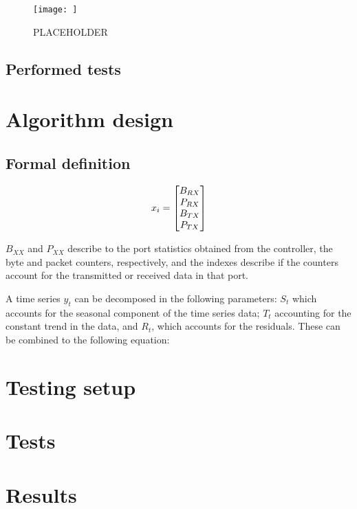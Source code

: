 \pagebreak
\begin{figure} 
    \centering
    \texttt{[image: ]}
    \caption {PLACEHOLDER}
    \label{fig:test_setup}
\end{figure} 

\subsection {Performed tests}

\subsubsection {}


\section {Algorithm design}
\subsection {Formal definition}


\begin {equation*}
\centering
x_i = 
\begin{bmatrix}
B_{RX}\\
P_{RX}\\
B_{TX}\\
P_{TX}\\
\end{bmatrix}
\end {equation*}


\par $B_{XX}$ and $P_{XX}$ describe to the port statistics obtained from the controller, the byte and packet counters, respectively, and the indexes describe if the counters account for the transmitted or received data in that port.
\par A time series $y_t$ can be decomposed in the following parameters: $S_t$ which accounts for the seasonal component of the time series data; $T_t$ accounting for the constant trend in the data, and $R_t$, which accounts for the 
residuals. These can be combined to the following equation:

\section {Testing setup}
\section {Tests}
\section {Results}

